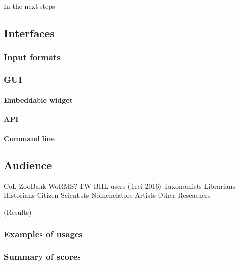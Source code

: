 \documentclass[
]{article}
\begin{document}
In the next steps

\hypertarget{interfaces}{%
\subsection{Interfaces}\label{interfaces}}

\hypertarget{input-formats}{%
\subsubsection{Input formats}\label{input-formats}}

\hypertarget{gui}{%
\subsubsection{GUI}\label{gui}}

\hypertarget{embeddable-widget}{%
\paragraph{Embeddable widget}\label{embeddable-widget}}

\hypertarget{api}{%
\paragraph{API}\label{api}}

\hypertarget{command-line}{%
\paragraph{Command line}\label{command-line}}

\hypertarget{audience}{%
\subsection{Audience}\label{audience}}

CoL ZooBank WoRMS? TW BHL users (Trei 2016) Taxonomists Librarians
Historians Citizen Scientists Nomenclators Artists Other Reseachers

(Results)

\hypertarget{examples-of-usages}{%
\subsubsection{Examples of usages}\label{examples-of-usages}}

\hypertarget{summary-of-scores}{%
\subsubsection{Summary of scores}\label{summary-of-scores}}
\end{document}

